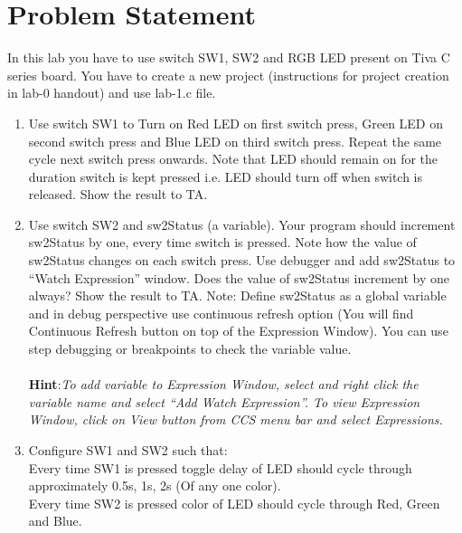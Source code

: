 \documentclass{article} %
\newcounter{points}
\begin{document}
\section {Problem Statement}

In this lab you have to use switch SW1, SW2 and RGB LED present on Tiva C series board. You
have to create a new project (instructions for project creation in lab-0 handout) and use lab-1.c file.
\begin{enumerate}
\item
Use switch SW1 to Turn on Red LED on first switch press, Green LED on second switch
press and Blue LED on third switch press. Repeat the same cycle next switch press onwards.
Note that LED should remain on for the duration switch is kept pressed i.e. LED should turn
off when switch is released. Show the result to TA.
\item
Use switch SW2 and sw2Status (a variable). Your program should increment sw2Status by
one, every time switch is pressed. Note how the value of sw2Status changes on each switch
press. Use debugger and add sw2Status to “Watch Expression” window. Does the value of
sw2Status increment by one always? Show the result to TA.
Note: Define sw2Status as a global variable and in debug perspective use continuous refresh option
(You will find Continuous Refresh button on top of the Expression Window). You can use step debugging
or breakpoints to check the variable value.
\\
\\
\textbf{Hint}:\textit{To add variable to Expression Window, select and right click the variable name and select “Add
Watch Expression”. To view Expression Window, click on View button from CCS menu bar and
select Expressions.}
\item
Configure SW1 and SW2 such that:
\\
\hspace{2mm}Every time SW1 is pressed toggle delay of LED should cycle through
approximately 0.5s, 1s, 2s (Of any one color).
\\
\hspace{2mm}Every time SW2 is pressed color of LED should cycle through Red, Green
and Blue.

\end{enumerate}
\end{document}
